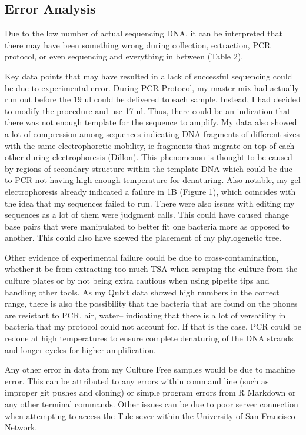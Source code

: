 \documentclass[]{article}
\begin{document}
\hypertarget{error-analysis}{%
\subsection{Error Analysis}\label{error-analysis}}

Due to the low number of actual sequencing DNA, it can be interpreted
that there may have been something wrong during collection, extraction,
PCR protocol, or even sequencing and everything in between (Table 2).

Key data points that may have resulted in a lack of successful
sequencing could be due to experimental error. During PCR Protocol, my
master mix had actually run out before the 19 ul could be delivered to
each sample. Instead, I had decided to modify the procedure and use 17
ul. Thus, there could be an indication that there was not enough
template for the sequence to amplify. My data also showed a lot of
compression among sequences indicating DNA fragments of different sizes
with the same electrophoretic mobility, ie fragments that migrate on top
of each other during electrophoresis (Dillon). This phenomenon is
thought to be caused by regions of secondary structure within the
template DNA which could be due to PCR not having high enough
temperature for denaturing. Also notable, my gel electrophoresis already
indicated a failure in 1B (Figure 1), which coincides with the idea that
my sequences failed to run. There were also issues with editing my
sequences as a lot of them were judgment calls. This could have caused
change base pairs that were manipulated to better fit one bacteria more
as opposed to another. This could also have skewed the placement of my
phylogenetic tree.

Other evidence of experimental failure could be due to
cross-contamination, whether it be from extracting too much TSA when
scraping the culture from the culture plates or by not being extra
cautious when using pipette tips and handling other tools. As my Qubit
data showed high numbers in the correct range, there is also the
possibility that the bacteria that are found on the phones are resistant
to PCR, air, water-- indicating that there is a lot of versatility in
bacteria that my protocol could not account for. If that is the case,
PCR could be redone at high temperatures to ensure complete denaturing
of the DNA strands and longer cycles for higher amplification.

Any other error in data from my Culture Free samples would be due to
machine error. This can be attributed to any errors within command line
(such as improper git pushes and cloning) or simple program errors from
R Markdown or any other terminal commands. Other issues can be due to
poor server connection when attempting to access the Tule sever within
the University of San Francisco Network.
\end{document}

